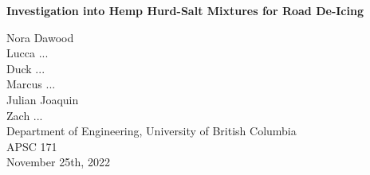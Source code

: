 \documentclass[12pt]{article}
\begin{document}
  \begin{center}
    \vspace*{\fill}

    \textbf{Investigation into Hemp Hurd-Salt Mixtures for Road De-Icing}
    \vspace{4em}

    Nora Dawood \\
    Lucca ... \\
    Duck ... \\
    Marcus ... \\
    Julian Joaquin \\
    Zach ... \\
    Department of Engineering, University of British Columbia \\
    APSC 171 \\
    November 25th, 2022

    \vspace*{\fill}
  \end{center}

  \newpage

  

  

  

  

  

  

  \newpage

  \printbibliography
\end{document}

